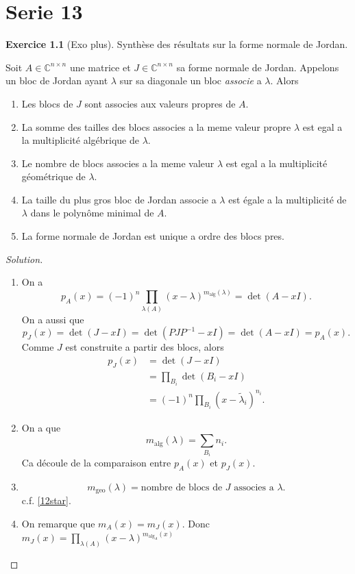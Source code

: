 \documentclass[a4paper,12pt,french]{report}
\theoremstyle{plain}
\theoremstyle{definition}
\newtheorem{exercise}{Exercice}[chapter]
\begin{document}
\chapter{Serie 13}
\begin{exercise}[Exo plus]
Synthèse des résultats sur la forme normale de Jordan.

Soit $A\in \mathbb{C}^{n\times n}$ une matrice et $J\in \mathbb{C}^{n\times n}$ sa forme normale de Jordan. Appelons un bloc de Jordan ayant $\lambda$ sur sa diagonale un bloc \emph{associe} a $\lambda$. Alors
\begin{enumerate}
\item Les blocs de $J$ sont associes aux valeurs propres de $A$.
\item La somme des tailles des blocs associes a la meme valeur propre $\lambda$ est egal a la multiplicité algébrique de $\lambda$.
\item Le nombre de blocs associes a la meme valeur $\lambda$ est egal a la multiplicité géométrique de $\lambda$.
\item La taille du plus gros bloc de Jordan associe a $\lambda$ est égale a la multiplicité de $\lambda$ dans le polynôme minimal de $A$.
\item La forme normale de Jordan est unique a ordre des blocs pres.
\end{enumerate}
\end{exercise}
\begin{proof}[Solution]
\begin{enumerate}
\item On a
$$
p_{A}(x)=(-1)^{n}\prod _{\lambda(A)}(x-\lambda)^{m_{\mathrm{alg}}(\lambda)}=\det(A-xI).
$$
On a aussi que
$$
p_{J}(x)=\det(J-xI)=\det(PJP^{-1}-xI)=\det(A-xI)=p_{A}(x).
$$
Comme $J$ est construite a partir des blocs, alors
\begin{align*}
p_{J}(x) & =\det(J-xI) \\
 & =\prod _{B_{i}}\det(B_{i}-xI) \\
 & =(-1)^{n}\prod _{B_{i}}(x-\tilde{\lambda}_{i})^{n_{i}}.
\end{align*}
\item On a que 
$$
m_{\mathrm{alg}}(\lambda)=\sum _{B_{i}}n_{i}.
$$
Ca découle de la comparaison entre $p_{A}(x)$ et $p_{J}(x)$.
\item
$$
m_{\mathrm{geo}}(\lambda)=\text{nombre de blocs de }J\text{ associes a }\lambda.
$$
c.f. \ref{12star}.
\item On remarque que $m_{A}(x)=m_{J}(x)$. Donc $m_{J}(x)=\prod _{\lambda(A)}(x-\lambda)^{m_{\mathrm{alg}_{A}}(x)}$
\end{enumerate}
\end{proof}
\end{document}
